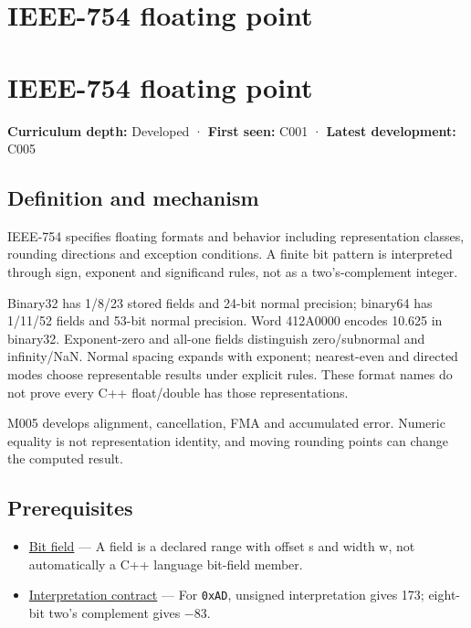 \hypertarget{appendix-343615f49ddf}{}
\section*{IEEE-754 floating point}
\section{IEEE-754 floating point}\label{appendix-343615f49ddf-ieee-754-floating-point}

\textbf{Curriculum depth:} Developed · \textbf{First seen:} C001 · \textbf{Latest development:} C005

\subsection{Definition and mechanism}\label{appendix-343615f49ddf-definition-and-mechanism}

IEEE-754 specifies floating formats and behavior including representation classes, rounding directions and exception conditions. A finite bit pattern is interpreted through sign, exponent and significand rules, not as a two's-complement integer.

Binary32 has 1/8/23 stored fields and 24-bit normal precision; binary64 has 1/11/52 fields and 53-bit normal precision. Word 412A0000 encodes 10.625 in binary32. Exponent-zero and all-one fields distinguish zero/subnormal and infinity/NaN. Normal spacing expands with exponent; nearest-even and directed modes choose representable results under explicit rules. These format names do not prove every C++ float/double has those representations.

M005 develops alignment, cancellation, FMA and accumulated error. Numeric equality is not representation identity, and moving rounding points can change the computed result.

\subsection{Prerequisites}\label{appendix-343615f49ddf-prerequisites}

\begin{itemize}
\tightlist
\item
  \hyperref[appendix-ac697f5c66e8]{Bit field} --- A field is a declared range with offset s and width w, not automatically a C++ language bit-field member.
\item
  \hyperref[appendix-f414bd4ed05c]{Interpretation contract} --- For \texttt{0xAD}, unsigned interpretation gives 173; eight-bit two's complement gives −83.
\end{itemize}

